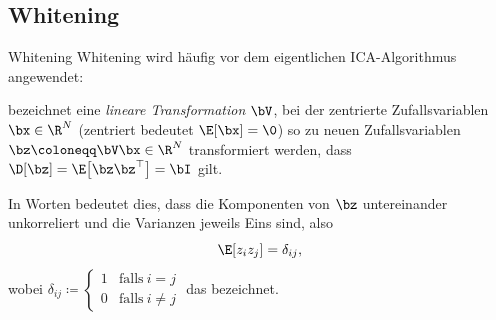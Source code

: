 \subsection{Whitening}

\begin{frame}{Whitening}{}
	Whitening wird häufig vor dem eigentlichen ICA-Algorithmus angewendet:
	\begin{mydef}
		 bezeichnet eine \textit{lineare Transformation} $\bV$,
		bei der zentrierte Zufallsvariablen $\bx \in \R^N$
		(zentriert bedeutet $\E[\bx] = \0$) so zu neuen Zufallsvariablen $\bz \coloneqq \bV \bx \in \R^N$ transformiert werden,
		dass $\D[\bz] = \E\bigl[ \bz \bz^\top \bigr] = \bI$ gilt.
	\end{mydef}

	In Worten bedeutet dies, dass die Komponenten von $\bz$ untereinander unkorreliert und die Varianzen jeweils Eins sind,
	also $$\E[z_i z_j] = \delta_{ij},$$ wobei $\delta_{ij} \coloneqq
	\begin{cases} 1 & \text{falls}\ i = j \\ 0 & \text{falls}\ i \ne j \end{cases}$ das  bezeichnet.
\end{frame}


